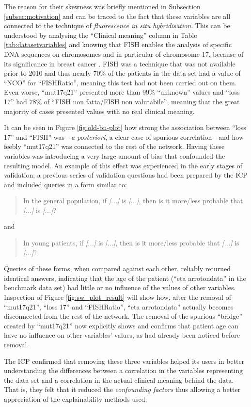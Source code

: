 The reason for their skewness was briefly mentioned in Subsection \ref{subsec:motivation} and can be traced to the fact that these variables are all connected to the technique of \textit{fluorescence in situ hybridisation}.
This can be understood by analysing the \enquote{Clinical meaning} column in Table \ref{tab:datasetvariables} and knowing that FISH enables the analysis of specific DNA sequences on chromosomes and in particular of chromosome 17, because of its significance in breast cancer \citep{zhang2011important}.
FISH was a technique that was not available prior to 2010 and thus nearly 70\% of the patients in the data set had a value of \enquote{NCO} for \enquote{FISHRatio}, meaning this test had not been carried out on them.
Even worse, \enquote{mut17q21} presented more than 99\% \enquote{unknown} values and \enquote{loss 17} had 78\% of \enquote{FISH non fatta/FISH non valutabile}, meaning that the great majority of cases presented values with no real clinical meaning.

It can be seen in Figure \ref{fig:old-bn-plot} how strong the association between \enquote{loss 17} and \enquote{FISH} was - \textit{a posteriori}, a clear case of spurious correlation - and how feebly \enquote{mut17q21} was connected to the rest of the network.
Having these variables was introducing a very large amount of bias that confounded the resulting model.
An example of this effect was experienced in the early stages of validation; a previous series of validation questions had been prepared by the ICP and included queries in a form similar to:
\begin{quotation}
	In the general population, if \textit{[...]} is \textit{[...]}, then is it more/less probable that \textit{[...]} is \textit{[...]}?
\end{quotation}
and
\begin{quotation}
	In young patients, if \textit{[...]} is \textit{[...]}, then is it more/less probable that \textit{[...]} is \textit{[...]}?
\end{quotation}
Queries of these forms, when compared against each other, reliably returned identical answers, indicating that the age of the patient (\enquote{eta arrotondata} in the benchmark data set) had little or no influence of the values of other variables.
Inspection of Figure \ref{fig:sw_plot_result} will show how, after the removal of \enquote{mut17q21}, \enquote{loss 17} and \enquote{FISHRatio}, \enquote{eta arrotondata} actually becomes disconnected from the rest of the network.
The removal of the spurious \enquote{bridge} created by \enquote{mut17q21} now explicitly shows and confirms that patient age can have no influence on other variables' values, as had already been noticed before removal. 

The ICP confirmed that removing these three variables helped its users in better understanding the differences between a correlation in the variables representing the data set and a correlation in the actual clinical meaning behind the data.
That is, they felt that it reduced the \textit{confounding factors} thus allowing a better appreciation of the explainability methods used.